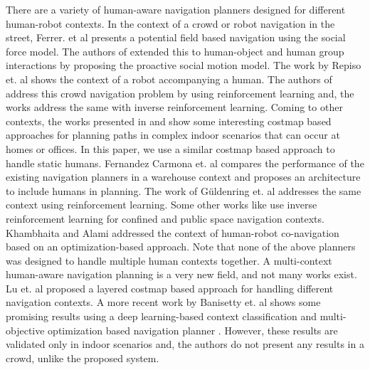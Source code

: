 There are a variety of human-aware navigation planners designed for different human-robot contexts. In the context of a crowd or robot navigation in the street, Ferrer. et al \cite{ferrer_social-aware_2013} presents a potential field based navigation using the social force model. The authors of \cite{truong_toward_2017} extended this to human-object and human group interactions by proposing the proactive social motion model. The work by Repiso et. al \cite{repiso2017line} shows the context of a robot accompanying a human. The authors of \cite{chen2017socially} address this crowd navigation problem by using reinforcement learning and, the works \cite{triebel2016spencer, okal2016learning} address the same with inverse reinforcement learning. Coming to other contexts, the works presented in \cite{sisbot2007human,truong2014dynamic} and \cite{kollmitz_time_2015} show some interesting costmap based approaches for planning paths in complex indoor scenarios that can occur at homes or offices. In this paper, we use a similar costmap based approach to handle static humans. Fernandez Carmona et. al \cite{carmona2019making} compares the performance of the existing navigation planners in a warehouse context and proposes an architecture to include humans in planning. The work of G\"{u}ldenring et. al \cite{guldenring2020learning} addresses the same context using reinforcement learning. Some other works like \cite{perez-higueras_robot_2014, perez2018teaching} use inverse reinforcement learning for confined and public space navigation contexts. Khambhaita and Alami \cite{khambhaita2017viewing} addressed the context of human-robot co-navigation based on an optimization-based approach. Note that none of the above planners was designed to handle multiple human contexts together. A multi-context human-aware navigation planning is a very new field, and not many works exist. Lu et. al \cite{lu_layered_2014} proposed a layered costmap based approach for handling different navigation contexts. A more recent work by Banisetty et. al \cite{banisetty2020deep} shows some promising results using a deep learning-based context classification and multi-objective optimization based navigation planner \cite{banisetty2019socially}. However, these results are validated only in indoor scenarios and, the authors do not present any results in a crowd, unlike the proposed system. 

